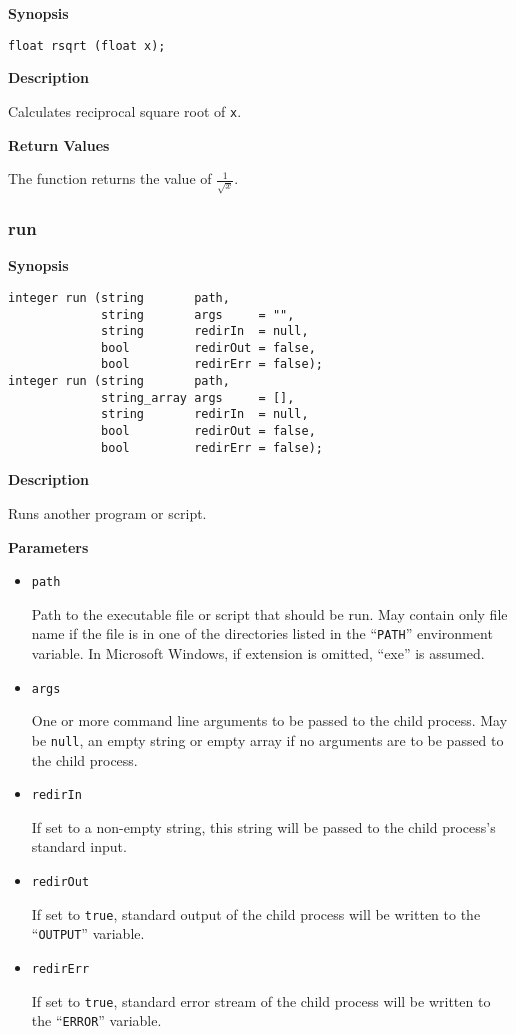 \documentclass[a4paper, 10pt, titlepage]{article}
\begin{document}
\textbf{Synopsis}

\begin{verbatim}
float rsqrt (float x);
\end{verbatim}

\textbf{Description}

Calculates reciprocal square root of \texttt{x}.

\textbf{Return Values}

The function returns the value of $\frac{1}{\sqrt{x}}$.

\subsubsection{run}

\textbf{Synopsis}

\begin{verbatim}
integer run (string       path,
             string       args     = "",
             string       redirIn  = null,
             bool         redirOut = false,
             bool         redirErr = false);
integer run (string       path,
             string_array args     = [],
             string       redirIn  = null,
             bool         redirOut = false,
             bool         redirErr = false);
\end{verbatim}

\textbf{Description}

Runs another program or script.

\textbf{Parameters}

\begin{itemize}
\item \texttt{path}

Path to the executable file or script that should be run. May contain only file name if the file is in one of the directories listed in the ``\texttt{PATH}'' environment variable. In Microsoft Windows, if extension is omitted, ``exe'' is assumed.

\item \texttt{args}

One or more command line arguments to be passed to the child process. May be \texttt{null}, an empty string or empty array if no arguments are to be passed to the child process.

\item \texttt{redirIn}

If set to a non-empty string, this string will be passed to the child process's standard input.

\item \texttt{redirOut}

If set to \texttt{true}, standard output of the child process will be written to the ``\texttt{OUTPUT}'' variable.

\item \texttt{redirErr}

If set to \texttt{true}, standard error stream of the child process will be written to the ``\texttt{ERROR}'' variable.
\end{itemize}
\end{document}
